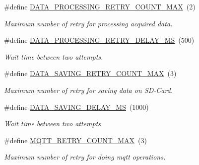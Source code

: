 \begin{DoxyCompactItemize}
\mbox{\label{rmap-config_8h_a7e36149c4e27cedef72823f8212b4fea}} 
\#define \hyperlink{rmap-config_8h_a7e36149c4e27cedef72823f8212b4fea}{D\+A\+T\+A\+\_\+\+P\+R\+O\+C\+E\+S\+S\+I\+N\+G\+\_\+\+R\+E\+T\+R\+Y\+\_\+\+C\+O\+U\+N\+T\+\_\+\+M\+AX}~(2)
\begin{DoxyCompactList}\small\item\em Maximum number of retry for processing acquired data. \end{DoxyCompactList}\item 
\mbox{\label{rmap-config_8h_a2933698b1b2aa94bf5755a89efbd05f7}} 
\#define \hyperlink{rmap-config_8h_a2933698b1b2aa94bf5755a89efbd05f7}{D\+A\+T\+A\+\_\+\+P\+R\+O\+C\+E\+S\+S\+I\+N\+G\+\_\+\+R\+E\+T\+R\+Y\+\_\+\+D\+E\+L\+A\+Y\+\_\+\+MS}~(500)
\begin{DoxyCompactList}\small\item\em Wait time between two attempts. \end{DoxyCompactList}\item 
\mbox{\label{rmap-config_8h_a81ed8eac7c6867ba31602628402f97c1}} 
\#define \hyperlink{rmap-config_8h_a81ed8eac7c6867ba31602628402f97c1}{D\+A\+T\+A\+\_\+\+S\+A\+V\+I\+N\+G\+\_\+\+R\+E\+T\+R\+Y\+\_\+\+C\+O\+U\+N\+T\+\_\+\+M\+AX}~(3)
\begin{DoxyCompactList}\small\item\em Maximum number of retry for saving data on S\+D-\/\+Card. \end{DoxyCompactList}\item 
\mbox{\label{rmap-config_8h_a511bba65f6e387335efa4c2ca6a9d948}} 
\#define \hyperlink{rmap-config_8h_a511bba65f6e387335efa4c2ca6a9d948}{D\+A\+T\+A\+\_\+\+S\+A\+V\+I\+N\+G\+\_\+\+D\+E\+L\+A\+Y\+\_\+\+MS}~(1000)
\begin{DoxyCompactList}\small\item\em Wait time between two attempts. \end{DoxyCompactList}\item 
\mbox{\label{rmap-config_8h_a823e4d8bca9ba0990f5c085dc997fafb}} 
\#define \hyperlink{rmap-config_8h_a823e4d8bca9ba0990f5c085dc997fafb}{M\+Q\+T\+T\+\_\+\+R\+E\+T\+R\+Y\+\_\+\+C\+O\+U\+N\+T\+\_\+\+M\+AX}~(3)
\begin{DoxyCompactList}\small\item\em Maximum number of retry for doing mqtt operations. \end{DoxyCompactList}\item 

\end{DoxyCompactItemize}
